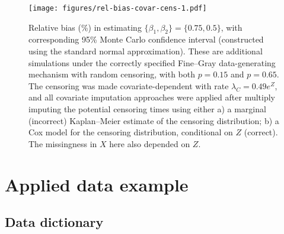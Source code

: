 \documentclass[
  12pt,
  a4paper,
]{article}
\begin{document}
\begin{figure}[H]

{\centering \texttt{[image: figures/rel-bias-covar-cens-1.pdf]}

}

\caption{Relative bias (\%) in estimating
\(\{\beta_1,\beta_2\}=\{0.75,0.5\}\), with corresponding 95\% Monte
Carlo confidence interval (constructed using the standard normal
approximation). These are additional simulations under the correctly
specified Fine--Gray data-generating mechanism with random censoring,
with both \(p = 0.15\) and \(p = 0.65\). The censoring was made
covariate-dependent with rate \(\lambda_C = 0.49e^Z\), and all covariate
imputation approaches were applied after multiply imputing the potential
censoring times using either a) a marginal (incorrect) Kaplan--Meier
estimate of the censoring distribution; b) a Cox model for the censoring
distribution, conditional on \(Z\) (correct). The missingness in \(X\)
here also depended on \(Z\).}

\end{figure}%

\newpage

\section{Applied data example}\label{applied-data-example}

\subsection{Data dictionary}\label{data-dictionary}
\end{document}
